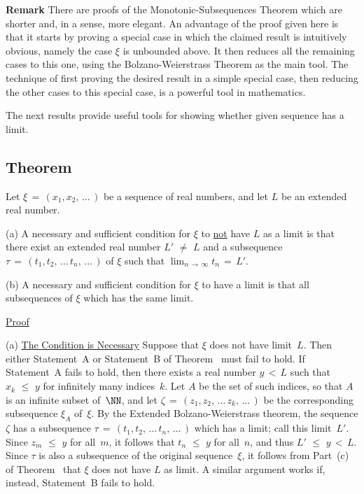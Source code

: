 \V

        {\bf Remark} There are proofs of the Monotonic-Subsequences Theorem which are shorter and, in a sense, more elegant.
    An advantage of the proof given here is that it starts by proving a special case in which the claimed result is intuitively obvious,
    namely the case ${\xi}$ is unbounded above. It then reduces all the remaining cases to this one,
    using the Bolzano-Weierstrass Theorem as the main tool. The technique of first proving the desired result in a simple special case,
    then reducing the other cases to this special case, is a powerful tool in mathematics.


\VV

        The next results provide useful tools for showing whether given sequence has a limit.


            \subsection{\small{\bf Theorem}}
            \label{ThmC30.20}

\V

        Let ${\xi} \,=\, (x_{1},x_{2},\,{\ldots}\,)$ be a sequence of real numbers, and let $L$ be an extended real number.


\V

        (a) A necessary and sufficient condition for ${\xi}$ to \underline{not} have $L$ as a limit
    is that there exist an extended real number $L' \,\,{\neq}\,\, L$ and a subsequence ${\tau} \,=\, (t_{1}, t_{2},\,{\ldots}\,t_{n}, \,{\ldots}\,)$
    of ${\xi}$ such that $\lim_{n \,{\rightarrow}\, {\infty}} t_{n} \,=\, L'$.

\V


        (b) A necessary and sufficient condition for ${\xi}$ to have a limit is that all subsequences of ${\xi}$ which has the same limit.

\V

        \underline{Proof}

\V

        (a)  \underline{The Condition is Necessary} Suppose that ${\xi}$ does not have limit~$L$.
    Then either Statement~A or Statement~B of Theorem~ must fail to hold.
    If Statement~A fails to hold, then there exists a real number $y\,<\,L$ such that $x_{k}\,\,{\leq}\,\,y$ for infinitely many indices~$k$.
    Let $A$ be the set of such indices, so that $A$ is an infinite subset of~${\NN}$,
    and let ${\zeta} \,=\, (z_{1},z_{2},\,{\ldots}\,z_{k},\,{\ldots}\,)$ be the corresponding subsequence ${\xi}_{A}$ of~${\xi}$.
    By the Extended Bolzano-Weierstrass theorem, the sequence ${\zeta}$ has a subsequence
    ${\tau} \,=\, (t_{1}, t_{2},\,{\ldots}\,t_{n},\,{\ldots}\,)$
which has a limit; call this limit~$L'$.
    Since $z_{m}\,\,{\leq}\,\,y$ for all~$m$, it follows that $t_{n}\,\,{\leq}\,\,y$ for all~$n$, and thus $L'\,\,{\leq}\,\,y\,<\,L$.
    Since ${\tau}$ is also a subsequence of the original sequence~${\xi}$, it follows
    from Part~(c) of Theorem~ that ${\xi}$ does not have $L$ as limit. A similar argument works if, instead, Statement~B fails to hold.

